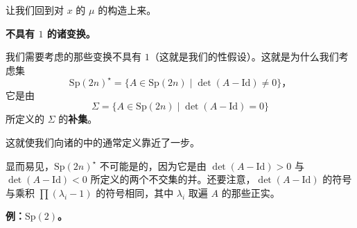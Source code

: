 让我们回到对\trPeriodic{}\trTrajectory{} $x$ 的\trIndex{} $\mu$ 的构造上来。

\textbf{不具有\trEigenvalue{} $1$ 的诸变换。}

我们需要考虑的那些\trSymplectic{}变换不具有\trEigenvalue{} $1$（这就是我们的\trNondegenerate{}性假设）。这就是为什么我们考虑\trOpen{}集
\[
\mathrm{Sp}(2n)^\star=\{A\in\mathrm{Sp}(2n)\mid\det(A-\mathrm{Id})\neq 0\}\text{，}
\]
它是由
\[
\Sigma=\{A\in\mathrm{Sp}(2n)\mid\det(A-\mathrm{Id})=0\}
\]
所定义的\trHypersurface{} $\Sigma$ 的\textbf{补集}。

这就使我们向诸\trLagrange{}的\trGrassmann\trManifold{}中\trMaslovIndex{}的通常定义靠近了一步。

显而易见，$\mathrm{Sp}(2n)^\star$ 不可能是\trConnected{}的，因为它是由 $\det(A-\mathrm{Id})>0$ 与 $\det(A-\mathrm{Id})<0$ 所定义的两个不交\trOpen{}集的并。还要注意，$\det(A-\mathrm{Id})$ 的符号与乘积 $\prod(\lambda_i-1)$ 的符号相同，其中 $\lambda_i$ 取遍 $A$ 的那些正实\trEigenvalue。

\textbf{例：$\mathrm{Sp}(2)$。}

